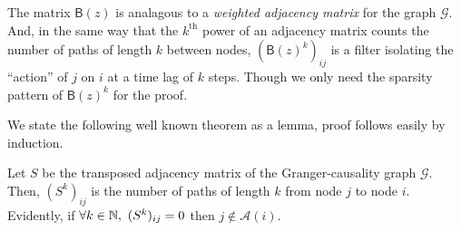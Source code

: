 \documentclass[12pt]{article}
\def\gcg{\mathcal{G}}  %
\def\B{\mathsf{B}}  %
\def\wtB{\widetilde{\B}}  %
\newcommand{\pa}[1]{pa(#1)}  %
\newcommand{\anc}[1]{\mathcal{A}(#1)}  %
\newcommand{\ancn}[2]{\mathcal{A}_{#1}(#2)}  %
\newcommand{\gpn}[2]{gp_{#1}(#2)}  %
\begin{document}






The matrix $\B(z)$ is analagous to a \textit{weighted adjacency
  matrix} for the graph $\gcg$.  And, in the same way that the
$k^{\text{th}}$ power of an adjacency matrix counts the number of
paths of length $k$ between nodes, $(\B(z)^k)_{ij}$ is a filter
isolating the ``action'' of $j$ on $i$ at a time lag of $k$ steps.
Though we only need the sparsity pattern of $\B(z)^k$ for the proof.

We state the following well known theorem as a lemma, proof follows
easily by induction.

\begin{lemma}
  \label{lem:adj_matrix}
  Let $S$ be the transposed adjacency matrix of the Granger-causality
  graph $\gcg$.  Then, $(S^k)_{ij}$ is the number of paths of length
  $k$ from node $j$ to node $i$.  Evidently, if
  $\forall k \in \mathbb{N},\ (S^k)_{ij} = 0$ then $j \not\in \anc{i}$.
\end{lemma}
\end{document}
